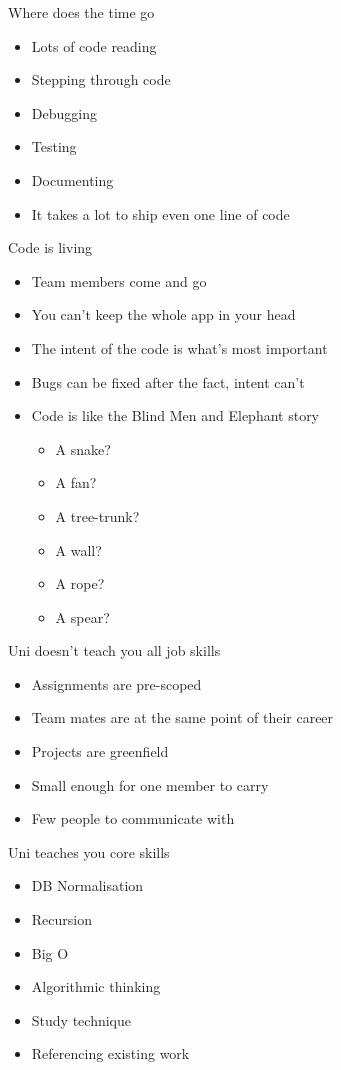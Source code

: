 \documentclass{beamer}
\begin{document}
\begin{frame}{Where does the time go}
\begin{itemize}
\item Lots of code reading
\item Stepping through code
\item Debugging
\item Testing
\item Documenting
\item It takes a lot to ship even one line of code
\end{itemize}
\end{frame}

\begin{frame}{Code is living}
\begin{itemize}
\item Team members come and go
\item You can't keep the whole app in your head
\item The intent of the code is what's most important
\item Bugs can be fixed after the fact, intent can't
\item Code is like the Blind Men and Elephant story
	\begin{itemize}
	\item A snake?
	\item A fan?
	\item A tree-trunk?
	\item A wall?
	\item A rope?
	\item A spear?
	\end{itemize}
\end{itemize}
\end{frame}

\begin{frame}{Uni doesn't teach you all job skills}
\begin{itemize}
\item Assignments are pre-scoped
\item Team mates are at the same point of their career
\item Projects are greenfield
\item Small enough for one member to carry
\item Few people to communicate with
\end{itemize}
\end{frame}

\begin{frame}{Uni teaches you core skills}
\begin{itemize}
\item DB Normalisation
\item Recursion
\item Big O
\item Algorithmic thinking
\item Study technique
\item Referencing existing work
\end{itemize}
\end{frame}
\end{document}
